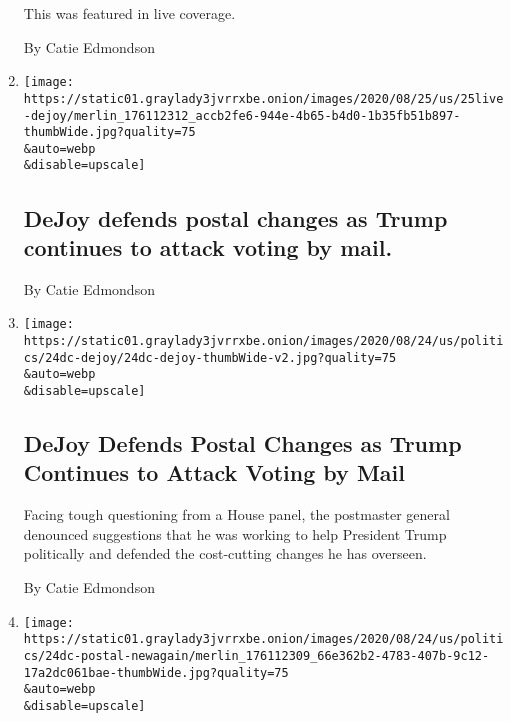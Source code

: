 \begin{enumerate}
  This was featured in live coverage.

  By Catie Edmondson
\item
  \href{/2020/08/25/us/elections/dejoy-defends-postal-changes-as-trump-continues-to-attack-voting-by-mail.html}{}

  \texttt{[image: https://static01.graylady3jvrrxbe.onion/images/2020/08/25/us/25live-dejoy/merlin\_176112312\_accb2fe6-944e-4b65-b4d0-1b35fb51b897-thumbWide.jpg?quality=75\\\&auto=webp\\\&disable=upscale]}

  \hypertarget{dejoy-defends-postal-changes-as-trump-continues-to-attack-voting-by-mail}{%
  \subsection{DeJoy defends postal changes as Trump continues to attack
  voting by
  mail.}\label{dejoy-defends-postal-changes-as-trump-continues-to-attack-voting-by-mail}}

  By Catie Edmondson
\item
  \href{/2020/08/24/us/politics/louis-dejoy-post-office-hearing.html}{}

  \texttt{[image: https://static01.graylady3jvrrxbe.onion/images/2020/08/24/us/politics/24dc-dejoy/24dc-dejoy-thumbWide-v2.jpg?quality=75\\\&auto=webp\\\&disable=upscale]}

  \hypertarget{dejoy-defends-postal-changes-as-trump-continues-to-attack-voting-by-mail-1}{%
  \subsection{DeJoy Defends Postal Changes as Trump Continues to Attack
  Voting by
  Mail}\label{dejoy-defends-postal-changes-as-trump-continues-to-attack-voting-by-mail-1}}

  Facing tough questioning from a House panel, the postmaster general
  denounced suggestions that he was working to help President Trump
  politically and defended the cost-cutting changes he has overseen.

  By Catie Edmondson
\item
  \href{/2020/08/24/us/elections/in-house-testimony-dejoy-calls-trumps-comments-about-mail-in-voting-not-helpful.html}{}

  \texttt{[image: https://static01.graylady3jvrrxbe.onion/images/2020/08/24/us/politics/24dc-postal-newagain/merlin\_176112309\_66e362b2-4783-407b-9c12-17a2dc061bae-thumbWide.jpg?quality=75\\\&auto=webp\\\&disable=upscale]}


\end{enumerate}
